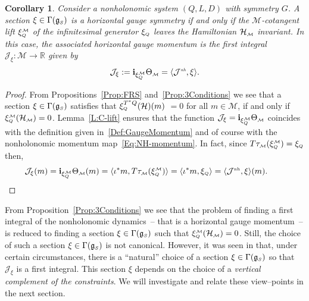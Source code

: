 \documentclass[10pt,a4paper]{amsart}
\numberwithin{equation}{section}
\newtheorem{Corollary}[Theorem]{Corollary}
\def\M{\mathcal{M}}
\def\J{\mathcal{J}}
\def\Ham{\mathcal{H}}
\def\R{\mathbb{R}}
\def\g{\mathfrak{g}}
\def\nh{{\mbox{\tiny{nh}}}}
\def\subM{{\mbox{\tiny{$\M$}}}}
\def\subSS{{\mbox{\tiny{$S$}}}}
\def\subQQ{{\mbox{\tiny{$Q$}}}}
\begin{document}
\begin{Corollary} \label{C:MLift}
  Consider a nonholonomic system $(Q,L,D)$ with symmetry $G$.
  A section $\xi\in\Gamma(\g_\subSS)$ is a {\it horizontal gauge symmetry} if and only if
  the $\M$-cotangent lift $\xi_{\mbox{\tiny{$Q$}}}^{\subM}$ of the infinitesimal generator
  $\xi_{\mbox{\tiny{$Q$}}}$ leaves the Hamiltonian $\Ham_\subM$ invariant. In this case, the associated horizontal gauge momentum is the first integral ${\mathcal J}_\xi\colon \M\to \R$ given by
  \begin{gather*}%
  {\mathcal J}_\xi:=
  {\bf i}_{\xi^\subM_{\mbox{\tiny{$Q$}}}}  \Theta_\subM = \langle \J^{\emph\nh}, \xi\rangle .
  \end{gather*}
\end{Corollary}

\begin{proof}
From Propositions~\ref{Prop:FRS} and~\ref{Prop:3Conditions} we see that a section $\xi\in\Gamma(\g_\subSS)$ satisf\/ies that  $\xi_\subQQ^{T^*Q} (\Ham) (m)$ $ = 0$ for all $m\in\M$, if and only if $\xi_\subQQ^\subM (\Ham_\subM) = 0$. Lemma~\ref{L:C-lift} ensures that the function $\mathcal{J}_\xi = {\bf i}_{\xi^\subM_{\mbox{\tiny{$Q$}}}}  \Theta_\subM$ coincides with the def\/inition given
 in~\eqref{Def:GaugeMomentum} and of course with the nonholonomic momentum map~\eqref{Eq:NH-momentum}. In fact, since $T\tau_\subM ( \xi_\subQQ^\subM ) = \xi_\subQQ$ then,
 \begin{gather*}
 \J_\xi(m) = {\bf i}_{\xi^\subM_{\mbox{\tiny{$Q$}}}}
 \Theta_\subM (m) = \langle \iota^*m, T\tau_\subM ( \xi_\subQQ^\subM ) \rangle =  \langle \iota^*m,
  \xi_\subQQ \rangle =  \langle {\mathcal J}^\nh , \xi \rangle (m).\tag*{\qed}
 \end{gather*}
 \renewcommand{\qed}{}
\end{proof}

From Proposition~\ref{Prop:3Conditions} we see that the problem of f\/inding a f\/irst integral of the nonholonomic dynamics~-- that is a horizontal gauge momentum~-- is reduced to  f\/inding a section $\xi \in \Gamma(\g_\subSS)$ such that $\xi^\subM_\subQQ(\Ham_\subM) = 0$. Still, the choice of such a section $\xi \in \Gamma(\g_\subSS)$ is not canonical.
However, it was seen in \cite{Paula} that, under certain circumstances, there is a ``natural'' choice of a section
$\xi \in \Gamma(\mathfrak{g}_{\subSS})$ so that $\J_\xi$ is a f\/irst integral.
This section $\xi$ depends on the choice of a {\it vertical complement of the constraints}.
We will investigate and relate these view--points in the next section.
\end{document}
